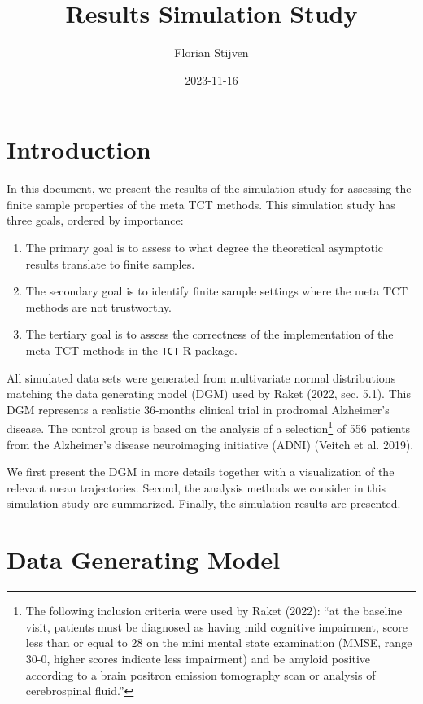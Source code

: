\documentclass[
]{article}
\title{Results Simulation Study}
\author{Florian Stijven}
\date{2023-11-16}
\providecommand{\tightlist}{%
  \setlength{\itemsep}{0pt}\setlength{\parskip}{0pt}}
\begin{document}
\maketitle

{
\setcounter{tocdepth}{2}
\tableofcontents
}
\hypertarget{introduction}{%
\section{Introduction}\label{introduction}}

In this document, we present the results of the simulation study for
assessing the finite sample properties of the meta TCT methods. This simulation
study has three goals, ordered by importance:

\begin{enumerate}
\def\labelenumi{\arabic{enumi}.}
\tightlist
\item
  The primary goal is to assess to what degree the theoretical asymptotic
  results translate to finite samples.
\item
  The secondary goal is to identify finite sample settings where the meta TCT
  methods are not trustworthy.
\item
  The tertiary goal is to assess the correctness of the implementation of the
  meta TCT methods in the \texttt{TCT} R-package.
\end{enumerate}

All simulated data sets were generated from multivariate normal distributions
matching the data generating model (DGM) used by Raket (2022, sec. 5.1).
This DGM represents a realistic 36-months clinical trial in
prodromal Alzheimer's disease. The control group is based on the analysis of a
selection\footnote{The following inclusion criteria were used by Raket (2022): ``at
  the baseline visit, patients must be diagnosed as having mild cognitive
  impairment, score less than or equal to 28 on the mini mental state examination
  (MMSE, range 30-0, higher scores indicate less impairment) and be amyloid
  positive according to a brain positron emission tomography scan or analysis of
  cerebrospinal fluid.''} of 556 patients from the Alzheimer's disease neuroimaging initiative (ADNI)
(Veitch et al. 2019).

We first present the DGM in more details together with a visualization of the
relevant mean trajectories. Second, the analysis methods we consider in this
simulation study are summarized. Finally, the simulation results are presented.

\hypertarget{data-generating-model}{%
\section{Data Generating Model}\label{data-generating-model}}
\end{document}
